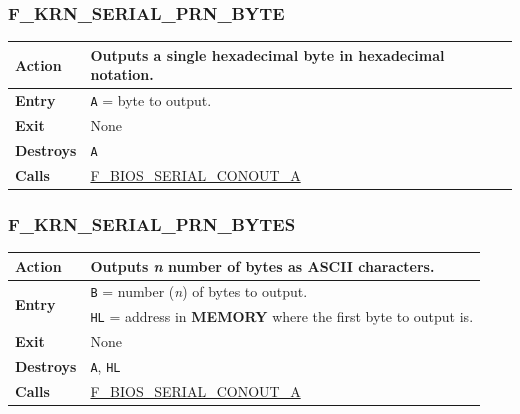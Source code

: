 \documentclass[a4paper,11pt]{article}
\begin{document}
        \subsubsection{F\_KRN\_SERIAL\_PRN\_BYTE}
        \label{func:fkrnserialprnbyte}
        \begin{tabular}{l p{9cm}}
            \hline\textbf{Action}
            & Outputs a single hexadecimal byte in hexadecimal notation.\\
            \hline\textbf{Entry}
            & \texttt{A} = byte to output.\\
            \hline\textbf{Exit} & None \\
            \hline\textbf{Destroys} & \texttt{A} \\
            \hline\textbf{Calls}
            & \hyperref[func:fbiosserialconouta]{F\_BIOS\_SERIAL\_CONOUT\_A}\\
            \hline
        \end{tabular}

        \subsubsection{F\_KRN\_SERIAL\_PRN\_BYTES}
        \label{func:fkrnserialprnbytes}
        \begin{tabular}{l p{9cm}}
            \hline\textbf{Action}
            & Outputs \textit{n} number of bytes as ASCII characters.\\
            \hline\multirow[t]{2}{4em}{\textbf{Entry}}
            & \texttt{B} = number (\textit{n}) of bytes to output.\\
            & \texttt{HL} = address in \textbf{MEMORY} where the first byte to
            output is. \\
            \hline\textbf{Exit} & None \\
            \hline\textbf{Destroys} & \texttt{A}, \texttt{HL} \\
            \hline\textbf{Calls}
            & \hyperref[func:fbiosserialconouta]{F\_BIOS\_SERIAL\_CONOUT\_A}\\
            \hline
        \end{tabular}

\end{document}
